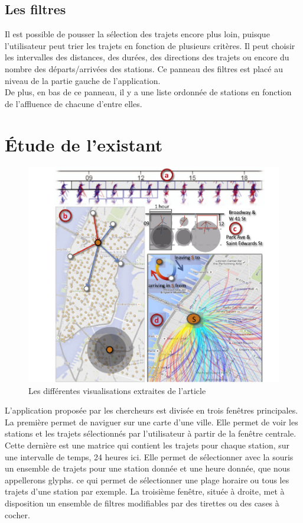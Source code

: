 \documentclass[12pt]{article}
\begin{document}
		\subsection{Les filtres}
		Il est possible de pousser la sélection des trajets encore plus loin, puisque l'utilisateur
		peut trier les trajets en fonction de plusieurs critères. Il peut choisir les intervalles
		des distances, des durées, des directions des trajets ou encore du nombre des
		départs/arrivées des stations. Ce panneau des filtres est placé au niveau de la partie gauche
		de l'application.\\
		De plus, en bas de ce panneau, il y a une liste ordonnée de stations en fonction
		de l'affluence de chacune d'entre elles.
	
\newpage
	\section{Étude de l’existant}	
	\begin{figure}[!h]
	\begin{center}
	\includegraphics[scale=.3]{screenshot_article.png}
	\caption{Les différentes visualisations extraites de l'article \cite{Oli16}}
	\end{center}
	\end{figure}
	
	L’application proposée par les chercheurs est divisée en trois fenêtres principales.
	La première permet de naviguer sur une carte d’une ville. Elle permet de voir les
	stations et les trajets sélectionnés par l’utilisateur à partir de la fenêtre centrale.
	Cette dernière est une matrice qui contient les trajets pour chaque station, sur une
	intervalle de temps, 24 heures ici. Elle permet de sélectionner avec la souris un
	ensemble de trajets pour une station donnée et une heure donnée, que nous appellerons glyphs.
	ce qui permet de sélectionner une plage horaire ou tous les trajets d'une station par exemple.
	La troisième fenêtre, située à droite, met à disposition un ensemble de filtres modifiables
	par des tirettes ou des cases à cocher. \\
	
\end{document}
